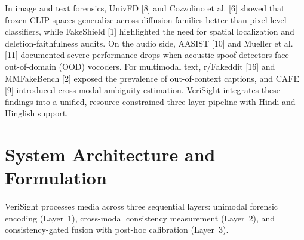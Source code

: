 \documentclass[conference]{IEEEtran}
\begin{document}
In image and text forensics, UnivFD [8] and Cozzolino et al. [6] showed that frozen CLIP spaces generalize across diffusion families better than pixel-level classifiers, while FakeShield [1] highlighted the need for spatial localization and deletion-faithfulness audits. On the audio side, AASIST [10] and Mueller et al. [11] documented severe performance drops when acoustic spoof detectors face out-of-domain (OOD) vocoders. For multimodal text, r/Fakeddit [16] and MMFakeBench [2] exposed the prevalence of out-of-context captions, and CAFE [9] introduced cross-modal ambiguity estimation. VeriSight integrates these findings into a unified, resource-constrained three-layer pipeline with Hindi and Hinglish support.

\section{System Architecture and Formulation}
VeriSight processes media across three sequential layers: unimodal forensic encoding (Layer~1), cross-modal consistency measurement (Layer~2), and consistency-gated fusion with post-hoc calibration (Layer~3).
\end{document}
